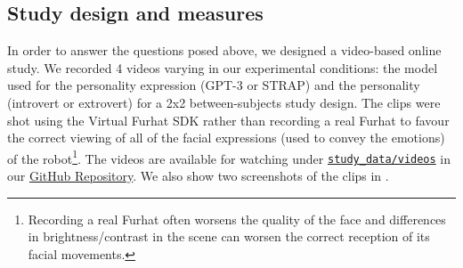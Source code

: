 \documentclass[nomenclature, english, biblatex]{kththesis}
\begin{document}
\subsection{Study design and measures}
In order to answer the questions posed above, we designed a video-based online study. We recorded 4 videos varying in our experimental conditions: the model used for the personality expression (GPT-3 or STRAP) and the personality (introvert or extrovert) for a 2x2 between-subjects study design. The clips were shot using the Virtual Furhat SDK rather than recording a real Furhat to favour the correct viewing of all of the facial expressions (used to convey the emotions) of the robot\footnote{Recording a real Furhat often worsens the quality of the face and differences in brightness/contrast in the scene can worsen the correct reception of its facial movements.}. The videos are available for watching under \href{https://github.com/alessioGalatolo/Furhat-Personality-and-Emotions/tree/main/study_data/videos}{\texttt{study_data/videos}} in our \href{https://github.com/alessioGalatolo/Furhat-Personality-and-Emotions/}{GitHub Repository}. We also show two screenshots of the clips in .
\end{document}
